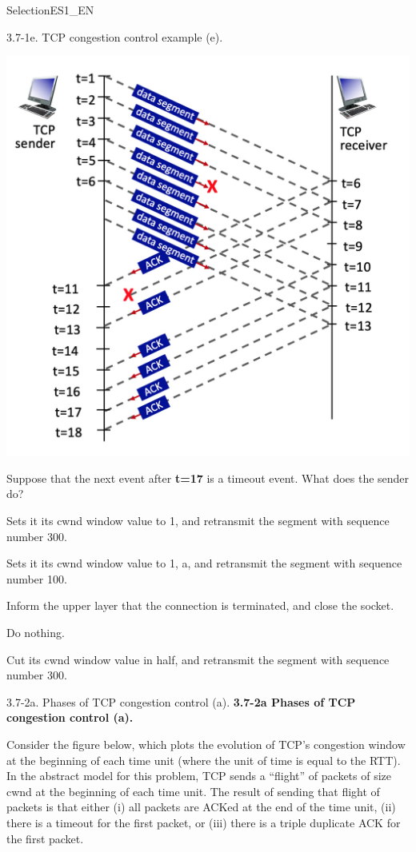 \documentclass[a4paper]{article}
\begin{document}
\begin{quiz}{SelectionES1\_EN}
\begin{multi}[points=1,shuffle]{3.7-1e. TCP congestion control example (e).}
\begin{center}
	\includegraphics[width=\linewidth]{figs/tcp_seq_ack_1.jpg}
\end{center}

Suppose that the next event after \textbf{t=17} is a timeout event.  What does the sender do?
\item* Sets it its cwnd window value to 1, and retransmit the segment with sequence number 300.
\item Sets it its cwnd window value to 1, a, and retransmit the segment with sequence number 100.
\item Inform the upper layer that the connection is terminated, and close the socket.
\item Do nothing.
\item Cut its cwnd window value in half, and retransmit the segment with sequence number 300.
\end{multi}

\begin{multi}[points=1,shuffle,multiple]{3.7-2a. Phases of TCP congestion control (a).}
\textbf{3.7-2a Phases of TCP congestion control (a).} 

Consider the figure below, which plots the evolution of TCP's congestion window at the beginning of each time unit (where the unit of time is equal to the RTT). In the abstract model for this problem, TCP sends a ``flight'' of packets of size cwnd at the beginning of each time unit. The result of sending that flight of packets is that either (i) all packets are ACKed at the end of the time unit, (ii) there is a timeout for the first packet, or (iii) there is a triple duplicate ACK for the first packet. 


\end{multi}
\end{quiz}
\end{document}
